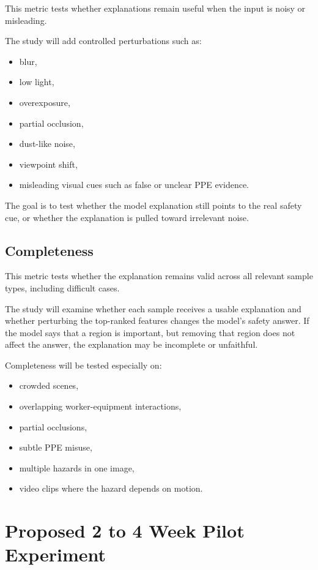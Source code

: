 \documentclass[11pt,letterpaper]{article}
\begin{document}
This metric tests whether explanations remain useful when the input is noisy or misleading.

The study will add controlled perturbations such as:

\begin{itemize}
  \item blur,
  \item low light,
  \item overexposure,
  \item partial occlusion,
  \item dust-like noise,
  \item viewpoint shift,
  \item misleading visual cues such as false or unclear PPE evidence.
\end{itemize}

The goal is to test whether the model explanation still points to the real safety cue, or whether the explanation is pulled toward irrelevant noise.

\subsection{Completeness}

This metric tests whether the explanation remains valid across all relevant sample types, including difficult cases.

The study will examine whether each sample receives a usable explanation and whether perturbing the top-ranked features changes the model's safety answer. If the model says that a region is important, but removing that region does not affect the answer, the explanation may be incomplete or unfaithful.

Completeness will be tested especially on:

\begin{itemize}
  \item crowded scenes,
  \item overlapping worker-equipment interactions,
  \item partial occlusions,
  \item subtle PPE misuse,
  \item multiple hazards in one image,
  \item video clips where the hazard depends on motion.
\end{itemize}

\section{Proposed 2 to 4 Week Pilot Experiment}
\end{document}
